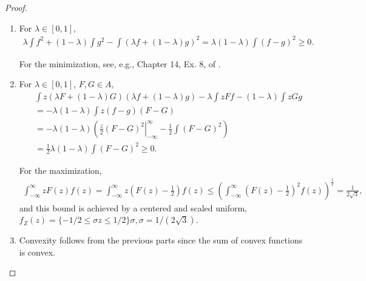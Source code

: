 \documentclass[12pt]{article}
\newcommand{\z}{Z}
\begin{document}
\begin{proof}
  \begin{enumerate}
  \item For $\lambda\in [0,1]$,
    \begin{align}
      \lambda \int f^2 + (1-\lambda)\int g^2 - \int (\lambda f + (1-\lambda)g)^2 = \lambda(1-\lambda)\int (f-g)^2 \ge 0 .
    \end{align}
    
    For the minimization, see, e.g., Chapter 14, Ex. 8, of \citet{vandervaart:00}.
  \item For $\lambda\in [0,1]$, $F,G\in A$,
    \begin{align}
      &\int z(\lambda F + (1-\lambda)G)(\lambda f+ (1-\lambda) g) - \lambda\int z F f - (1-\lambda)\int z G g\\
      &=-\lambda(1-\lambda)\int z(f-g)(F-G)\\
      &= -\lambda(1-\lambda)\left(\left.\frac{z}{2}(F-G)^2 \right|_{-\infty}^\infty - \frac{1}{2}\int(F-G)^2\right)\\
      &= \frac{1}{2}\lambda(1-\lambda)\int(F-G)^2\ge 0.
    \end{align}
    
    For the maximization,
    \begin{align}
      \int_{-\infty}^{\infty}zF(z)f(z) =
      \int_{-\infty}^{\infty}z\left(F(z)-\frac12\right)f(z)
      \le \left(\int_{-\infty}^\infty\left(F(z)-\frac12\right)^2 f(z)\right)^{\frac12} = \frac{1}{2\sqrt{3}},
    \end{align}
    and this bound is achieved by a centered and scaled uniform, $f_\z(z)=\{-1/2\le \sigma z \le 1/2\}\sigma, \sigma=1/(2\sqrt{3}).$%


  \item Convexity follows from the previous parts since the sum of convex functions is convex.


\end{enumerate}
\end{proof}
\end{document}
